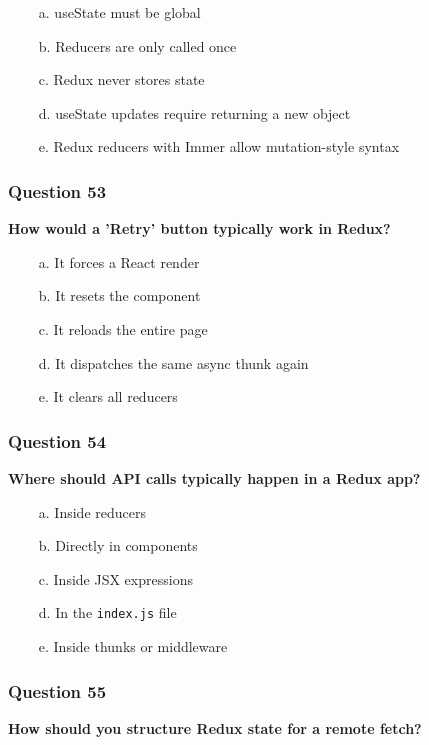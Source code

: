\documentclass{article}
\newcommand{\cmark}{\textcolor{green}{\ding{51}}} %
\newcommand{\xmark}{\textcolor{red}{\ding{55}}}   %
\begin{document}
\begin{itemize}
  \item[\xmark\ a.] useState must be global
  \item[\xmark\ b.] Reducers are only called once
  \item[\xmark\ c.] Redux never stores state
  \item[\cmark\ d.] useState updates require returning a new object
  \item[\cmark\ e.] Redux reducers with Immer allow mutation-style syntax
\end{itemize}

\subsubsection*{Question 53}
\textbf{How would a 'Retry' button typically work in Redux?}

\begin{itemize}
  \item[\xmark\ a.] It forces a React render
  \item[\xmark\ b.] It resets the component
  \item[\xmark\ c.] It reloads the entire page
  \item[\cmark\ d.] It dispatches the same async thunk again
  \item[\xmark\ e.] It clears all reducers
\end{itemize}

\subsubsection*{Question 54}
\textbf{Where should API calls typically happen in a Redux app?}

\begin{itemize}
  \item[\xmark\ a.] Inside reducers
  \item[\xmark\ b.] Directly in components
  \item[\xmark\ c.] Inside JSX expressions
  \item[\xmark\ d.] In the \texttt{index.js} file
  \item[\cmark\ e.] Inside thunks or middleware
\end{itemize}

\subsubsection*{Question 55}
\textbf{How should you structure Redux state for a remote fetch?}
\end{document}
